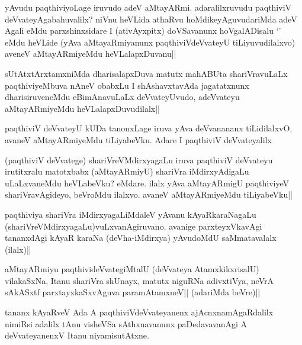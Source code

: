 
\begin{artha}
yAvudu paqthiviyoLage iruvudo adeV aMtayARmi. adaralilxruvudu paqthiviV deVvateyAgabahuvalilx? niVnu heVLida athaRvu hoMdikeyAguvudariMda adeV Agali eMdu parxshinxsidare I (ativAyxpitx) doVSavanunx hoVgalADisalu `\stext ' eMdu heVLide (yAva aMtayaRmiyanunx paqthiviVdeVvateyU tiLiyuvudilalxvo) aveneV aMtayARmiyeMdu heVLalapxDuvanu||
\end{artha}

\begin{artha}
sUtAtxtArxtamxniMda dharisalapxDuva matutx mahABUta shariVravuLaLx paqthiviyeMbuva nAneV obabxLu I shAshavxtavAda jagatatxnunx dharisiruveneMdu eBimAnavuLaLx deVvateyUvudo, adeVvateyu aMtayARmiyeMdu heVLalapxDuvudilalx||
\end{artha}

\begin{artha}
paqthiviV deVvateyU kUDa tanonxLage iruva yAva deVvanananx tiLidilalxvO, avaneV aMtayARmiyeMdu tiLiyabeVku. Adare I paqthiviV deVvateyalilx 
\end{artha}


\begin{artha}
(paqthiviV deVvatege) shariVreVMdirxyagaLu iruva paqthiviV deVvateyu irutitxralu matotxbabx (aMtayARmiyU) shariVra iMdirxyAdigaLu uLaLxvaneMdu heVLabeVku? eMdare. ilalx yAva aMtayARmigU paqthiviyeV shariVravAgideyo, beVroMdu ilalxvo. avaneV aMtayARmiyeMdu tiLiyabeVku||
\end{artha}

\begin{artha}
paqthiviya shariVra iMdirxyagaLiMdaleV yAvanu kAyaRkaraNagaLu (shariVreVMdirxyagaLu)vuLxvanAgiruvano. avanige parxteyxVkavAgi tananxdAgi kAyaR karaNa (deVha-iMdirxya) yAvudoMdU saMmatavalalx (ilalx)||
\end{artha}


\begin{artha}
aMtayARmiyu paqthivideVvategiMtalU (deVvateya AtamxkikxrisalU) vilakaSxNa, Itanu shariVra shUnayx, matutx niguRNa adivxtiVya, neVrA  sAkASxtf parxtayxkaSxvAguva paramAtamxneV|| (adariMda beVre)||
\end{artha}

\begin{artha}%
tananx kAyaRveV Ada A paqthiviVdeVvateyanenx ajAcnxnamAgaRdalilx nimiRsi adalilx tAnu visheVSa sAthxnavanunx paDedavavanAgi A deVvateyanenxV Itanu niyamisutAtxne.
\end{artha}

